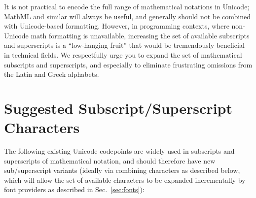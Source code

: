 \documentclass[10pt,english]{article}
\newcommand{\secref}[1]{Sec.~\ref{sec:#1}}
\begin{document}
It is not practical to encode the full range of mathematical
notations in Unicode; MathML and similar will always be useful,
and generally should not be combined with Unicode-based formatting.
However, in programming contexts, where non-Unicode math formatting
is unavailable, increasing the set of available subscripts
and superscripts is a ``low-hanging fruit'' that would be tremendously
beneficial in technical fields. We respectfully urge you to expand the
set of mathematical subscripts and superscripts, and especially to
eliminate frustrating omissions from the Latin and Greek alphabets.


\section{Suggested Subscript/Superscript Characters}
\label{sec:required}

The following existing Unicode codepoints are widely used in subscripts and superscripts of mathematical notation, and should therefore have new sub/superscript variants (ideally via combining characters as described below, which will allow the set of available characters to be expanded incrementally by font providers as described in \secref{fonts}):
\end{document}
